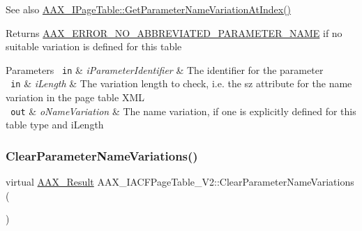 \begin{DoxyItemize}
\item \begin{DoxySeeAlso}{See also}
\mbox{\hyperlink{a01849_adffe5a5f2ad548bd4c704508d816d568}{A\+A\+X\+\_\+\+I\+Page\+Table\+::\+Get\+Parameter\+Name\+Variation\+At\+Index()}}
\end{DoxySeeAlso}
\begin{DoxyReturn}{Returns}
\mbox{\hyperlink{a00494_a5f8c7439f3a706c4f8315a9609811937ab7383b0169f6dfa5f86b1fefd6c58ae2}{A\+A\+X\+\_\+\+E\+R\+R\+O\+R\+\_\+\+N\+O\+\_\+\+A\+B\+B\+R\+E\+V\+I\+A\+T\+E\+D\+\_\+\+P\+A\+R\+A\+M\+E\+T\+E\+R\+\_\+\+N\+A\+ME}} if no suitable variation is defined for this table
\end{DoxyReturn}

\begin{DoxyParams}[1]{Parameters}
\mbox{\texttt{ in}}  & {\em i\+Parameter\+Identifier} & The identifier for the parameter \\
\hline
\mbox{\texttt{ in}}  & {\em i\+Length} & The variation length to check, i.\+e. the {\ttfamily sz} attribute for the name variation in the page table X\+ML \\
\hline
\mbox{\texttt{ out}}  & {\em o\+Name\+Variation} & The name variation, if one is explicitly defined for this table type and {\ttfamily i\+Length} \\
\hline
\end{DoxyParams}

\end{DoxyItemize}\mbox{\label{a01729_ada210c1f77658103f2796ae3011bc603}} 
\subsubsection{\texorpdfstring{ClearParameterNameVariations()}{ClearParameterNameVariations()}}
{\footnotesize\ttfamily virtual \mbox{\hyperlink{a00392_a4d8f69a697df7f70c3a8e9b8ee130d2f}{A\+A\+X\+\_\+\+Result}} A\+A\+X\+\_\+\+I\+A\+C\+F\+Page\+Table\+\_\+\+V2\+::\+Clear\+Parameter\+Name\+Variations (\begin{DoxyParamCaption}{ }\end{DoxyParamCaption})\hspace{0.3cm}{\ttfamily [pure virtual]}}





